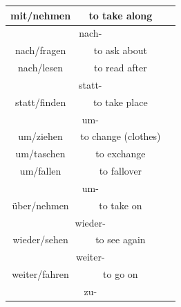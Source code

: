 \begin{center}
\begin{longtable} {|c|c|c|}
        mit/nehmen      & to take along             &                                             \\
        \hline
        \multicolumn{3}{|c|}{nach-}                                                               \\
        \hline
        nach/fragen     & to ask about              &                                             \\
        nach/lesen      & to read after             &                                             \\
        \hline
        \multicolumn{3}{|c|}{statt-}                                                              \\
        \hline
        statt/finden    & to take place             &                                             \\
        \hline
        \multicolumn{3}{|c|}{um-}                                                                 \\
        \hline
        um/ziehen       & to change (clothes)       &                                             \\
        um/taschen      & to exchange               &                                             \\
        um/fallen       & to fallover               &                                             \\
        \hline
        \multicolumn{3}{|c|}{um-}                                                                 \\
        \hline
        über/nehmen     & to take on                &                                             \\
        \hline
        \multicolumn{3}{|c|}{wieder-}                                                             \\
        \hline
        wieder/sehen    & to see again              &                                             \\
        \hline
        \multicolumn{3}{|c|}{weiter-}                                                             \\
        \hline
        weiter/fahren   & to go on                  &                                             \\
        \hline
        \multicolumn{3}{|c|}{zu-}                                                                 \\
        \hline

\end{longtable}
\end{center}
